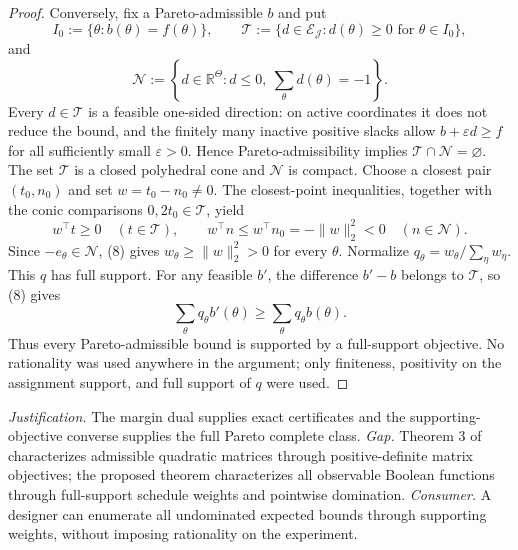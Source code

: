 \documentclass{article}
\begin{document}
\begin{proof}
Conversely, fix a Pareto-admissible \(b\) and put
\[
 I_0:=\{\theta:b(\theta)=f(\theta)\},\quad\quad
 \mathcal T:=\{d\in\mathcal E_{\mathcal J}:d(\theta)\ge0\text{ for }\theta\in I_0\},
\]
and
\[
 \mathcal N:=\left\{d\in\mathbb R^\Theta:d\le0,
              \ \sum_\theta d(\theta)=-1\right\}.
\]
Every \(d\in\mathcal T\) is a feasible one-sided direction: on active coordinates it does not reduce the bound, and the finitely many inactive positive slacks allow \(b+\varepsilon d\ge f\) for all sufficiently small \(\varepsilon>0\).  Hence Pareto-admissibility implies \(\mathcal T\cap\mathcal N=\varnothing\).  The set \(\mathcal T\) is a closed polyhedral cone and \(\mathcal N\) is compact.  Choose a closest pair \((t_0,n_0)\) and set \(w=t_0-n_0\ne0\).  The closest-point inequalities, together with the conic comparisons \(0,2t_0\in\mathcal T\), yield
\[
 w^\top t\ge0\quad(t\in\mathcal T),\quad\quad
 w^\top n\le w^\top n_0=-\|w\|_2^2<0\quad(n\in\mathcal N). \tag{8}
\]
Since \(-e_\theta\in\mathcal N\), (8) gives \(w_\theta\ge\|w\|_2^2>0\) for every \(\theta\).  Normalize \(q_\theta=w_\theta/\sum_\eta w_\eta\).  This \(q\) has full support.  For any feasible \(b'\), the difference \(b'-b\) belongs to \(\mathcal T\), so (8) gives
\[
 \sum_\theta q_\theta b'(\theta)\ge
 \sum_\theta q_\theta b(\theta).
\]
Thus every Pareto-admissible bound is supported by a full-support objective.  No rationality was used anywhere in the argument; only finiteness, positivity on the assignment support, and full support of \(q\) were used.
\end{proof}
\par\smallskip\noindent \textit{Justification.} The margin dual supplies exact certificates and the supporting-objective converse supplies the full Pareto complete class. \textit{Gap.} Theorem 3 of \cite{HarshawMiddletonSavje2026} characterizes admissible quadratic matrices through positive-definite matrix objectives; the proposed theorem characterizes all observable Boolean functions through full-support schedule weights and pointwise domination. \textit{Consumer.} A designer can enumerate all undominated expected bounds through supporting weights, without imposing rationality on the experiment.
\end{document}
